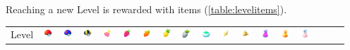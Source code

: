 Reaching a new Level is rewarded with items (\autoref{table:levelitems}).
\begin{table}[t]
  \begin{center}
  \setlength{\tabcolsep}{1pt}
  \footnotesize
  \begin{tabular}{r g c g c g c g c g c g c g c g c g}
  Level &
  \includegraphics[width=1em]{images/pokeball.png} &
  \includegraphics[width=1em]{images/greatball.png} &
  \includegraphics[width=1em]{images/ultraball.png} &
  \includegraphics[width=1em]{images/nanab.png} &
  \includegraphics[width=1em]{images/razz.png} &
  \includegraphics[width=1em]{images/goldenrazz.png} &
  \includegraphics[width=1em]{images/pinap.png} &
  \includegraphics[width=1em]{images/silverpinap.png} &
  \includegraphics[width=1em]{images/incense.png} &
  \includegraphics[width=1em]{images/revive.png} &
  \includegraphics[width=1em]{images/maxrevive.png} &
  \includegraphics[width=1em]{images/Potion.png} &
  \includegraphics[width=1em]{images/Super_Potion.png} &
  \includegraphics[width=1em]{images/Hyper_Potion.png} &

\end{tabular}
\end{center}
\end{table}
